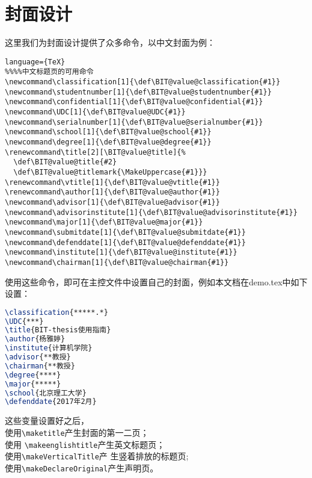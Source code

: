 \section{封面设计}
这里我们为封面设计提供了众多命令，以中文封面为例：
\begin{lstlisting}language={TeX}
%%%%中文标题页的可用命令
\newcommand\classification[1]{\def\BIT@value@classification{#1}}
\newcommand\studentnumber[1]{\def\BIT@value@studentnumber{#1}}
\newcommand\confidential[1]{\def\BIT@value@confidential{#1}}
\newcommand\UDC[1]{\def\BIT@value@UDC{#1}}
\newcommand\serialnumber[1]{\def\BIT@value@serialnumber{#1}}
\newcommand\school[1]{\def\BIT@value@school{#1}}
\newcommand\degree[1]{\def\BIT@value@degree{#1}}
\renewcommand\title[2][\BIT@value@title]{%
  \def\BIT@value@title{#2}
  \def\BIT@value@titlemark{\MakeUppercase{#1}}}
\renewcommand\vtitle[1]{\def\BIT@value@vtitle{#1}}
\renewcommand\author[1]{\def\BIT@value@author{#1}}
\newcommand\advisor[1]{\def\BIT@value@advisor{#1}}
\newcommand\advisorinstitute[1]{\def\BIT@value@advisorinstitute{#1}}
\newcommand\major[1]{\def\BIT@value@major{#1}}
\newcommand\submitdate[1]{\def\BIT@value@submitdate{#1}}
\newcommand\defenddate[1]{\def\BIT@value@defenddate{#1}}
\newcommand\institute[1]{\def\BIT@value@institute{#1}}
\newcommand\chairman[1]{\def\BIT@value@chairman{#1}}

\end{lstlisting}

使用这些命令，即可在主控文件中设置自己的封面，例如本文档在demo.tex中如下
设置：
\begin{lstlisting}[language={TeX}]
\classification{*****.*}
\UDC{***}
\title{BIT-thesis使用指南}
\author{杨雅婷}
\institute{计算机学院}
\advisor{**教授}
\chairman{**教授}
\degree{****}
\major{*****}
\school{北京理工大学}
\defenddate{2017年2月}
\end{lstlisting}

这些变量设置好之后，\\使用\verb+\maketitle+产生封面的第一二页；\\使用
\verb+\makeenglishtitle+产生英文标题页；\\使用\verb+\makeVerticalTitle+产
生竖着排放的标题页;\\使用\verb+\makeDeclareOriginal+产生声明页。
